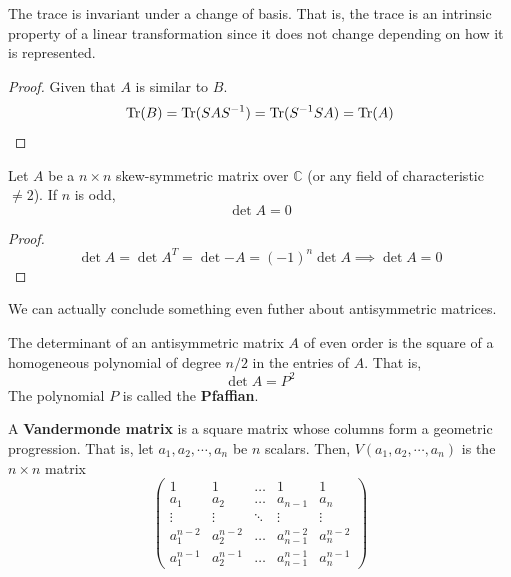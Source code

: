   \begin{corollary}
    The trace is invariant under a change of basis. That is, the trace is an intrinsic property of a linear transformation since it does not change depending on how it is represented. 
  \end{corollary}
  \begin{proof}
    Given that $A$ is similar to $B$. 
    \begin{equation}
      \operatorname{Tr}(B) = \operatorname{Tr}(S A S^{-1}) = \operatorname{Tr}(S^{-1} S A) = \operatorname{Tr}(A) 
    \end{equation}
  \end{proof}

  \begin{theorem}
    Let $A$ be a $n \times n$ skew-symmetric matrix over $\mathbb{C}$ (or any field of characteristic $\neq 2$). If $n$ is odd, 
    \begin{equation}
      \det{A} = 0 
    \end{equation}
  \end{theorem}
  \begin{proof}
    \begin{equation}
      \det{A} = \det{A^T} = \det{-A} = (-1)^n \det{A} \implies \det{A} = 0 
    \end{equation}
  \end{proof}

  We can actually conclude something even futher about antisymmetric matrices. 

  \begin{theorem}
    The determinant of an antisymmetric matrix $A$ of even order is the square of a homogeneous polynomial of degree $n/2$ in the entries of $A$. That is, 
    \begin{equation}
      \det{A} = P^2
    \end{equation}
    The polynomial $P$ is called the \textbf{Pfaffian}. 
  \end{theorem}

  \begin{definition}
    A \textbf{Vandermonde matrix} is a square matrix whose columns form a geometric progression. That is, let $a_1, a_2, \cdots, a_n$ be $n$ scalars. Then, $V(a_1, a_2, \cdots, a_n)$ is the $n \times n$ matrix
    \begin{equation}
      \begin{pmatrix}
        1&1&\ldots&1&1 \\
        a_1&a_2&\ldots&a_{n-1}&a_n\\
        \vdots&\vdots&\ddots&\vdots&\vdots\\
        a_1^{n-2}&a_2^{n-2}&\ldots&a_{n-1}^{n-2}&a_n^{n-2}\\
        a_1^{n-1}&a_2^{n-1}&\ldots&a_{n-1}^{n-1}&a_n^{n-1}
      \end{pmatrix}
    \end{equation}
  \end{definition}

